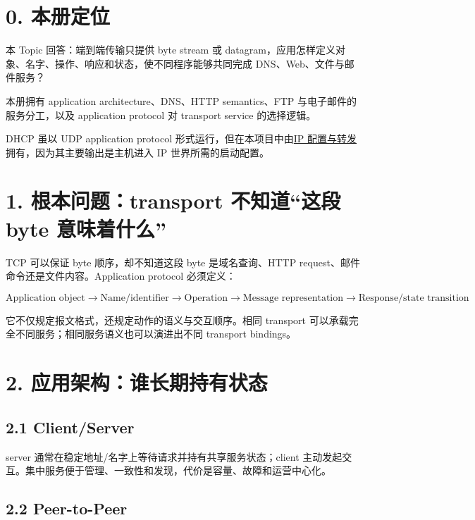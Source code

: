 \documentclass[UTF8,fontset=none,11pt,a4paper]{ctexart}
\begin{document}
\section{0. 本册定位}\label{0-ux672cux518cux5b9aux4f4d}

本 Topic 回答：端到端传输只提供 byte stream 或
datagram，应用怎样定义对象、名字、操作、响应和状态，使不同程序能够共同完成
DNS、Web、文件与邮件服务？

本册拥有 application architecture、DNS、HTTP semantics、FTP
与电子邮件的服务分工，以及 application protocol 对 transport service
的选择逻辑。

DHCP 虽以 UDP application protocol
形式运行，但在本项目中由\href{../04_IP地址_子网与分组转发/README.md}{IP
配置与转发}拥有，因为其主要输出是主机进入 IP 世界所需的启动配置。

\section{1. 根本问题：transport 不知道``这段 byte
意味着什么''}\label{1-ux6839ux672cux95eeux9898transport-ux4e0dux77e5ux9053ux8fd9ux6bb5-byte-ux610fux5473ux7740ux4ec0ux4e48}

TCP 可以保证 byte 顺序，却不知道这段 byte 是域名查询、HTTP
request、邮件命令还是文件内容。Application protocol 必须定义：

\[
\boxed{
\text{Application object}
\to \text{Name/identifier}
\to \text{Operation}
\to \text{Message representation}
\to \text{Response/state transition}
}
\]

它不仅规定报文格式，还规定动作的语义与交互顺序。相同 transport
可以承载完全不同服务；相同服务语义也可以演进出不同 transport bindings。

\section{2.
应用架构：谁长期持有状态}\label{2-ux5e94ux7528ux67b6ux6784ux8c01ux957fux671fux6301ux6709ux72b6ux6001}

\subsection{2.1 Client/Server}\label{21-clientserver}

server 通常在稳定地址/名字上等待请求并持有共享服务状态；client
主动发起交互。集中服务便于管理、一致性和发现，代价是容量、故障和运营中心化。

\subsection{2.2 Peer-to-Peer}\label{22-peer-to-peer}
\end{document}
